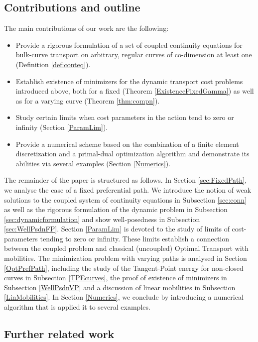 \documentclass{article}
\begin{document}
\subsection*{Contributions and outline}
The main contributions of our work are the following:
\begin{itemize}
\item Provide a rigorous formulation of a set of coupled continuity equations for bulk-curve transport on arbitrary, regular curves of co-dimension at least one (Definition \ref{def:conteq}).
\item Establish existence of minimizers for the dynamic transport cost problems introduced above, both for a fixed (Theorem \ref{ExistenceFixedGamma}) as well as for a varying curve (Theorem \ref{thm:compn}).
\item Study certain limits when cost parameters in the action tend to zero or infinity (Section \ref{ParamLim}).
\item Provide a numerical scheme based on the combination of a finite element discretization and a primal-dual optimization algorithm and demonstrate its abilities via several examples (Section \ref{Numerics}).
\end{itemize}
The remainder of the paper is structured as follows. In Section \ref{sec:FixedPath}, we analyse the case of a fixed preferential path. We introduce the notion of weak solutions to the coupled system of continuity equations in Subsection \ref{sec:conn} as well as the rigorous formulation of the dynamic problem in Subsection \ref{sec:dynamicformulation} and show well-posedness in Subsection \ref{sec:WellPsdnFP}. Section \ref{ParamLim} is devoted to the study of limits of cost-parameters tending to zero or infinity. These limits establish a connection between the coupled problem and classical (uncoupled) Optimal Transport with mobilities. The minimization problem with varying paths is analysed in Section \ref{OptPrefPath}, including the study of the Tangent-Point energy for non-closed curves in Subsection \ref{TPEcurves}, the proof of existence of minimizers in Subsection \ref{WellPsdnVP} and a discussion of linear mobilities in Subsection \ref{LinMobilities}. In Section \ref{Numerics}, we conclude by introducing a numerical algorithm that is applied it to several examples.

\subsection{Further related work}
\end{document}
